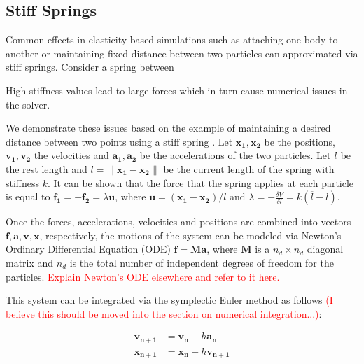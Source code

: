 \subsection{Stiff Springs}\label{ss:stiff-springs}
Common effects in elasticity-based simulations such as attaching one body to another or maintaining fixed distance between two 
particles can approximated via stiff springs. Consider a spring between 


High stiffness values lead to large forces which in turn cause numerical issues in the solver. 

We demonstrate these issues based on the example of maintaining a desired distance between two points using a stiff 
spring \cite{tournier2015}. Let $\bm{x_1, x_2}$ be the positions, $\bm{v_1, v_2}$ the velocities and $\bm{a_1, a_2}$
be the accelerations of the two particles. Let $\overline{l}$ be the rest length and $l = \lVert \bm{x_1} - \bm{x_2} \rVert$ 
be the current length of the spring with stiffness $k$. It can be shown that the force that the spring applies at each particle
is equal to $\bm{f_1} = -\bm{f_2} = \lambda\bm{u}$, where $\bm{u} = (\bm{x_1} - \bm{x_2}) / l$
and $\lambda = -\frac{\delta V}{\delta l} = k(\overline{l} - l)$. 

Once the forces, accelerations, velocities and positions are combined into vectors $\bm{f}, \bm{a}, \bm{v}, \bm{x}$, 
respectively, the motions of the system can be modeled via Newton's Ordinary Differential Equation (ODE) $\bm{f} = \bm{Ma}$,
where $\bm{M}$ is a $n_d \times n_d$ diagonal matrix and $n_d$ is the total number of independent degrees of freedom for the 
particles. \textcolor{red}{Explain Newton's ODE elsewhere and refer to it here.}

This system can be integrated via the symplectic Euler method as follows \textcolor{red}{(I believe this should be moved into
the section on numerical integration...)}:

\begin{align*}
    \bm{v_{n+1}} &= \bm{v_n} + h\bm{a_n} \\
    \bm{x_{n+1}} &= \bm{x_n} + h\bm{v_{n+1}}
\end{align*}

